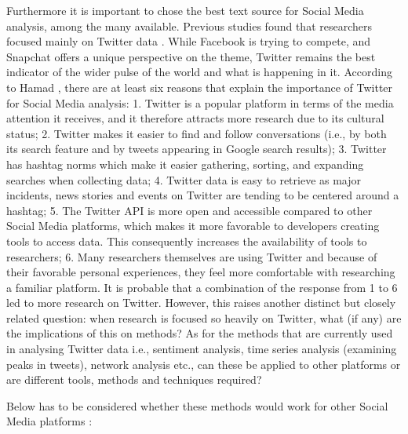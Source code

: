 \documentclass[]{book}
\begin{document}
Furthermore it is important to chose the best text source for Social
Media analysis, among the many available. Previous studies found that
researchers focused mainly on Twitter data \citep{ossola2018}. While
Facebook is trying to compete, and Snapchat offers a unique perspective
on the theme, Twitter remains the best indicator of the wider pulse of
the world and what is happening in it. According to Hamad
\citep{ahmed2017using}, there are at least six reasons that explain the
importance of Twitter for Social Media analysis: 1. Twitter is a popular
platform in terms of the media attention it receives, and it therefore
attracts more research due to its cultural status; 2. Twitter makes it
easier to find and follow conversations (i.e., by both its search
feature and by tweets appearing in Google search results); 3. Twitter
has hashtag norms which make it easier gathering, sorting, and expanding
searches when collecting data; 4. Twitter data is easy to retrieve as
major incidents, news stories and events on Twitter are tending to be
centered around a hashtag; 5. The Twitter API is more open and
accessible compared to other Social Media platforms, which makes it more
favorable to developers creating tools to access data. This consequently
increases the availability of tools to researchers; 6. Many researchers
themselves are using Twitter and because of their favorable personal
experiences, they feel more comfortable with researching a familiar
platform. It is probable that a combination of the response from 1 to 6
led to more research on Twitter. However, this raises another distinct
but closely related question: when research is focused so heavily on
Twitter, what (if any) are the implications of this on methods? As for
the methods that are currently used in analysing Twitter data i.e.,
sentiment analysis, time series analysis (examining peaks in tweets),
network analysis etc., can these be applied to other platforms or are
different tools, methods and techniques required?

Below has to be considered whether these methods would work for other
Social Media platforms \citep{ahmed2017using}:
\end{document}
